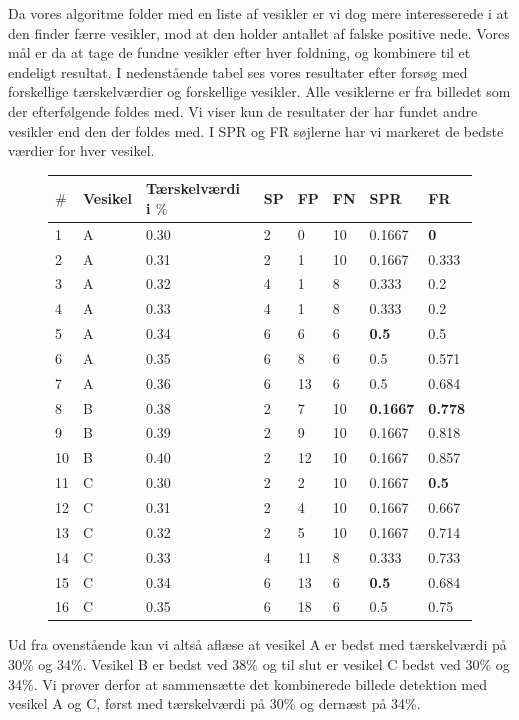Da vores algoritme folder med en liste af vesikler er vi dog mere interesserede i at den finder færre vesikler, mod at den holder antallet af falske positive nede. Vores mål er da at tage de fundne vesikler efter hver foldning, og kombinere til et endeligt resultat. I nedenstående tabel ses vores resultater efter forsøg med forskellige tærskelværdier og forskellige  vesikler. Alle vesiklerne er fra billedet som der efterfølgende foldes med. Vi viser kun de resultater der har fundet andre vesikler end den der foldes med. I SPR og FR søjlerne har vi markeret de bedste værdier for hver vesikel.
\begin{figure}[H]
	\centering
\begin{tabular}{l|l|l|l|l|l|l|l}
	$\#$ & Vesikel & Tærskelværdi i $\%$ & SP & FP & FN & SPR & FR \\\hline
	1	&	A	&	0.30	& 2		& 0		&10 &0.1667 &\textbf{0}\\\hline
	2	&	A	&	0.31	& 2		& 1		&10 &0.1667 &0.333\\\hline
	3	&	A	&	0.32	& 4		& 1		&8  &0.333 	&0.2\\\hline
	4	&	A	&	0.33	& 4		& 1		&8  &0.333 	&0.2\\\hline
	5	&	A	&	0.34	& 6		& 6		&6  &\textbf{0.5} 	&0.5\\\hline
	6	&	A	&	0.35	& 6		& 8		&6  &0.5 	&0.571\\\hline
	7	&	A	&	0.36	& 6		& 13	&6  &0.5	&0.684\\\hline
	8	&	B	&	0.38	& 2		& 7		&10 &\textbf{0.1667} &\textbf{0.778}\\\hline
	9	&	B	&	0.39	& 2		& 9		&10 &0.1667 &0.818\\\hline
	10	&	B	&	0.40	& 2		& 12	&10 &0.1667 &0.857\\\hline
	11	&	C	&	0.30	& 2		& 2		&10 &0.1667	&\textbf{0.5}\\\hline
	12	&	C	&	0.31	& 2		& 4		&10 &0.1667	&0.667\\\hline
	13	&	C	&	0.32	& 2		& 5		&10 &0.1667	&0.714\\\hline
	14	&	C	&	0.33	& 4		& 11	&8 	&0.333 	&0.733\\\hline
	15	&	C	&	0.34	& 6		& 13	&6 	&\textbf{0.5} 	&0.684\\\hline
	16	&	C	&	0.35	& 6		& 18	&6 	&0.5 	&0.75
\end{tabular} 
\end{figure}

Ud fra ovenstående kan vi altså aflæse at vesikel A er bedst med tærskelværdi på 30\% og 34\%. Vesikel B er bedst ved 38\% og til slut er vesikel C bedst ved 30\% og 34\%. Vi prøver derfor at sammensætte det kombinerede billede detektion med vesikel A og C, først med tærskelværdi på 30\% og dernæst på 34\%. 

